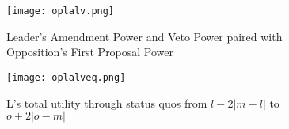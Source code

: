 \documentclass[12pt]{article}
\theoremstyle{plain}		      \newtheorem{assn}{Assumption}
\theoremstyle{plain}		      \newtheorem{prop}{Proposition}
\theoremstyle{plain}		      \newtheorem{lemma}{Lemma}
\theoremstyle{plain}	          \newtheorem{imp}{Implication}
\theoremstyle{plain}	          \newtheorem{hyp}{Hypothesis}
\theoremstyle{definition}		  \newtheorem{defn}{Definition}
\theoremstyle{remark}	          \newtheorem{rem}{Remark}
\theoremstyle{definition}         \newtheorem{case}{Case}
\begin{document}
\begin{figure}[h]
  \centering
  \begin{minipage}[b]{0.3\textwidth}
    \texttt{[image: oplalv.png]}
    \caption{Leader's Amendment Power and Veto Power paired with Opposition's First Proposal Power}
    \label{oplalv}
  \end{minipage}
  \hfill
  \begin{minipage}[b]{0.6\textwidth}
    \texttt{[image: oplalveq.png]}
    \caption{L's total utility through status quos from \newline $l-2|m-l|$ to $o+2|o-m|$}
    \label{oplalveq}
  \end{minipage}
\end{figure}
\FloatBarrier
\end{document}

